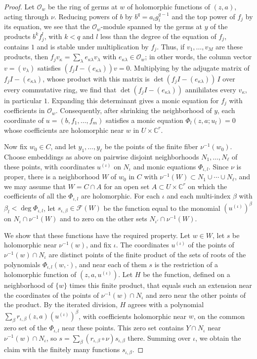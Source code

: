 \begin{proof}
Let $\mathcal O_w$ be the ring of germs at $w$ of holomorphic functions of $(z,a)$, acting through $\nu$. Reducing powers of $b$ by $b^q=a_ig_i^{q-1}$ and the top power of $f_j$ by its equation, we see that the $\mathcal O_w$-module spanned by the germs at $y$ of the products $b^kf_j^l$, with $k<q$ and $l$ less than the degree of the equation of $f_j$, contains $1$ and is stable under multiplication by $f_j$. Thus, if $v_1,\ldots,v_M$ are these products, then $f_jv_\kappa=\sum_\lambda e_{\kappa\lambda}v_\lambda$ with $e_{\kappa\lambda}\in\mathcal O_w$; in other words, the column vector $v=(v_\lambda)$ satisfies $(f_jI-(e_{\kappa\lambda}))v=0$. Multiplying by the adjugate matrix of $f_jI-(e_{\kappa\lambda})$, whose product with this matrix is $\det(f_jI-(e_{\kappa\lambda}))\,I$ over every commutative ring, we find that $\det(f_jI-(e_{\kappa\lambda}))$ annihilates every $v_\kappa$, in particular $1$. Expanding this determinant gives a monic equation for $f_j$ with coefficients in $\mathcal O_w$. Consequently, after shrinking the neighborhood of $y$, each coordinate of $u=(b,f_1,\ldots,f_m)$ satisfies a monic equation $\Phi_l(z,a;u_l)=0$ whose coefficients are holomorphic near $w$ in $U\times\mathbb C^r$.

Now fix $w_0\in C$, and let $y_1,\ldots,y_\ell$ be the points of the finite fiber $\nu^{-1}(w_0)$. Choose embeddings as above on pairwise disjoint neighborhoods $N_1,\ldots,N_\ell$ of these points, with coordinates $u^{(\iota)}$ on $N_\iota$ and monic equations $\Phi_{\iota,l}$. Since $\nu$ is proper, there is a neighborhood $W$ of $w_0$ in $C$ with $\nu^{-1}(W)\subset N_1\cup\cdots\cup N_\ell$, and we may assume that $W=C\cap A$ for an open set $A\subset U\times\mathbb C^r$ on which the coefficients of all the $\Phi_{\iota,l}$ are holomorphic. For each $\iota$ and each multi-index $\beta$ with $\beta_l<\deg\Phi_{\iota,l}$, let $s_{\iota,\beta}\in\mathcal F(W)$ be the function equal to the monomial $(u^{(\iota)})^\beta$ on $N_\iota\cap\nu^{-1}(W)$ and to zero on the other sets $N_{\iota'}\cap\nu^{-1}(W)$.

We show that these functions have the required property. Let $w\in W$, let $s$ be holomorphic near $\nu^{-1}(w)$, and fix $\iota$. The coordinates $u^{(\iota)}$ of the points of $\nu^{-1}(w)\cap N_\iota$ are distinct points of the finite product of the sets of roots of the polynomials $\Phi_{\iota,l}(w,\cdot)$, and near each of them $s$ is the restriction of a holomorphic function of $(z,a,u^{(\iota)})$. Let $H$ be the function, defined on a neighborhood of $\{w\}$ times this finite product, that equals such an extension near the coordinates of the points of $\nu^{-1}(w)\cap N_\iota$ and zero near the other points of the product. By the iterated division, $H$ agrees with a polynomial $\sum_\beta r_{\iota,\beta}(z,a)(u^{(\iota)})^\beta$, with coefficients holomorphic near $w$, on the common zero set of the $\Phi_{\iota,l}$ near these points. This zero set contains $Y\cap N_\iota$ near $\nu^{-1}(w)\cap N_\iota$, so $s=\sum_\beta(r_{\iota,\beta}\circ\nu)s_{\iota,\beta}$ there. Summing over $\iota$, we obtain the claim with the finitely many functions $s_{\iota,\beta}$.


\end{proof}
